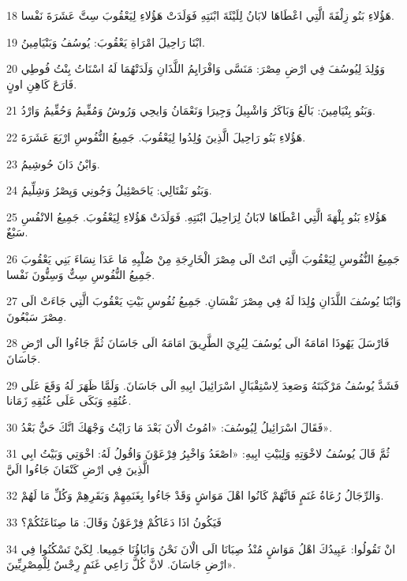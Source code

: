 \par 18 هَؤُلاءِ بَنُو زِلْفَةَ الَّتِي اعْطَاهَا لابَانُ لِلَيْئَةَ ابْنَتِهِ فَوَلَدَتْ هَؤُلاءِ لِيَعْقُوبَ سِتَّ عَشَرَةَ نَفْسا.
\par 19 ابْنَا رَاحِيلَ امْرَاةِ يَعْقُوبَ: يُوسُفُ وَبَنْيَامِينُ.
\par 20 وَوُلِدَ لِيُوسُفَ فِي ارْضِ مِصْرَ: مَنَسَّى وَافْرَايِمُ اللَّذَانِ وَلَدَتْهُمَا لَهُ اسْنَاتُ بِنْتُ فُوطِي فَارَعَ كَاهِنِ اونٍ.
\par 21 وَبَنُو بِنْيَامِينَ: بَالَعُ وَبَاكَرُ وَاشْبِيلُ وَجِيرَا وَنَعْمَانُ وَايحِي وَرُوشُ وَمُفِّيمُ وَحُفِّيمُ وَارْدُ.
\par 22 هَؤُلاءِ بَنُو رَاحِيلَ الَّذِينَ وُلِدُوا لِيَعْقُوبَ. جَمِيعُ النُّفُوسِ ارْبَعَ عَشَرَةَ.
\par 23 وَابْنُ دَانَ حُوشِيمُ.
\par 24 وَبَنُو نَفْتَالِي: يَاحَصْئِيلُ وَجُونِي وَيِصْرُ وَشِلِّيمُ.
\par 25 هَؤُلاءِ بَنُو بِلْهَةَ الَّتِي اعْطَاهَا لابَانُ لِرَاحِيلَ ابْنَتِهِ. فَوَلَدَتْ هَؤُلاءِ لِيَعْقُوبَ. جَمِيعُ الانْفُسِ سَبْعٌ.
\par 26 جَمِيعُ النُّفُوسِ لِيَعْقُوبَ الَّتِي اتَتْ الَى مِصْرَ الْخَارِجَةِ مِنْ صُلْبِهِ مَا عَدَا نِسَاءَ بَنِي يَعْقُوبَ جَمِيعُ النُّفُوسِ سِتٌّ وَسِتُّونَ نَفْسا.
\par 27 وَابْنَا يُوسُفَ اللَّذَانِ وُلِدَا لَهُ فِي مِصْرَ نَفْسَانِ. جَمِيعُ نُفُوسِ بَيْتِ يَعْقُوبَ الَّتِي جَاءَتْ الَى مِصْرَ سَبْعُونَ.
\par 28 فَارْسَلَ يَهُوذَا امَامَهُ الَى يُوسُفَ لِيُرِيَ الطَّرِيقَ امَامَهُ الَى جَاسَانَ ثُمَّ جَاءُوا الَى ارْضِ جَاسَانَ.
\par 29 فَشَدَّ يُوسُفُ مَرْكَبَتَهُ وَصَعِدَ لِاسْتِقْبَالِ اسْرَائِيلَ ابِيهِ الَى جَاسَانَ. وَلَمَّا ظَهَرَ لَهُ وَقَعَ عَلَى عُنُقِهِ وَبَكَى عَلَى عُنُقِهِ زَمَانا.
\par 30 فَقَالَ اسْرَائِيلُ لِيُوسُفَ: «امُوتُ الْانَ بَعْدَ مَا رَايْتُ وَجْهَكَ انَّكَ حَيٌّ بَعْدُ».
\par 31 ثُمَّ قَالَ يُوسُفُ لاخْوَتِهِ وَلِبَيْتِ ابِيهِ: «اصْعَدُ وَاخْبِرُ فِرْعَوْنَ وَاقُولُ لَهُ: اخْوَتِي وَبَيْتُ ابِي الَّذِينَ فِي ارْضِ كَنْعَانَ جَاءُوا الَيَّ
\par 32 وَالرِّجَالُ رُعَاةُ غَنَمٍ فَانَّهُمْ كَانُوا اهْلَ مَوَاشٍ وَقَدْ جَاءُوا بِغَنَمِهِمْ وَبَقَرِهِمْ وَكُلِّ مَا لَهُمْ.
\par 33 فَيَكُونُ اذَا دَعَاكُمْ فِرْعَوْنُ وَقَالَ: مَا صِنَاعَتُكُمْ؟
\par 34 انْ تَقُولُوا: عَبِيدُكَ اهْلُ مَوَاشٍ مُنْذُ صِبَانَا الَى الْانَ نَحْنُ وَابَاؤُنَا جَمِيعا. لِكَيْ تَسْكُنُوا فِي ارْضِ جَاسَانَ. لانَّ كُلَّ رَاعِي غَنَمٍ رِجْسٌ لِلْمِصْرِيِّينَ».

